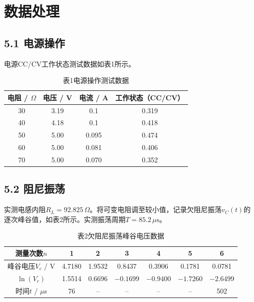 \documentclass[12pt, a4paper]{article}
\begin{document}
\section*{数据处理}

\subsection*{5.1 电源操作}

电源CC/CV工作状态测试数据如表1所示。

\begin{table}[H]
\centering
\caption*{表1\quad 电源操作测试数据}
\begin{tabular}{cccc}
\toprule
电阻 / $\Omega$ & 电压 / V & 电流 / A & 工作状态（CC/CV）\\
\midrule
30 & 3.19 & 0.1 & 0.319 \\
40 & 4.18 & 0.1 & 0.418 \\
50 & 5.00 & 0.095 & 0.474 \\
60 & 5.00 & 0.081 & 0.406 \\
70 & 5.00 & 0.070 & 0.352 \\
\bottomrule
\end{tabular}
\end{table}

\subsection*{5.2 阻尼振荡}

实测电感内阻$R_L = 92.825\,\Omega$。将可变电阻调至较小值，记录欠阻尼振荡$v_C(t)$的逐次峰谷值，如表2所示。实测振荡周期$T = 85.2\,\mu\mathrm{s}$。

\begin{table}[H]
\centering
\caption*{表2\quad 欠阻尼振荡峰谷电压数据}
\begin{tabular}{ccccccc}
\toprule
测量次数$n$ & 1 & 2 & 3 & 4 & 5 & 6 \\
\midrule
峰谷电压$V_c$ / V & 4.7180 & 1.9532 & 0.8437 & 0.3906 & 0.1781 & 0.0781 \\
$\ln(V_c)$ & 1.5514 & 0.6696 & $-0.1699$ & $-0.9400$ & $-1.7260$ & $-2.6499$ \\
时间$t$ / $\mu$s & 76 & -- & -- & -- & -- & 502 \\
\bottomrule
\end{tabular}
\end{table}
\end{document}
